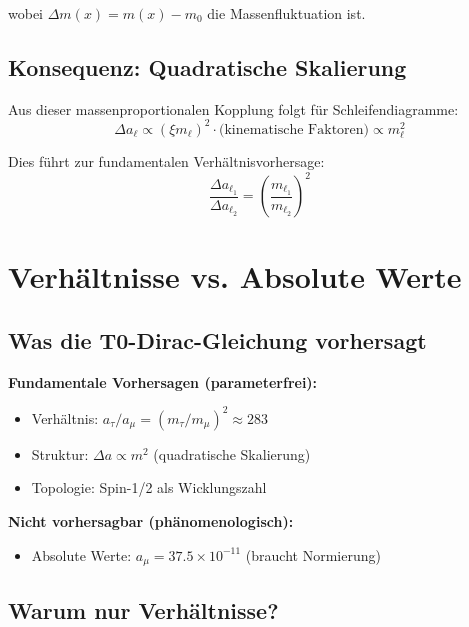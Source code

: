 	wobei $\Delta m(x) = m(x) - m_0$ die Massenfluktuation ist.
	
	\subsection{Konsequenz: Quadratische Skalierung}
	
	Aus dieser massenproportionalen Kopplung folgt für Schleifendiagramme:
	\begin{equation}
		\Delta a_\ell \propto (\xi m_\ell)^2 \cdot \text{(kinematische Faktoren)} \propto m_\ell^2
		\label{eq:quadratic_scaling}
	\end{equation}
	
	Dies führt zur fundamentalen Verhältnisvorhersage:
	\begin{equation}
		\boxed{\frac{\Delta a_{\ell_1}}{\Delta a_{\ell_2}} = \left(\frac{m_{\ell_1}}{m_{\ell_2}}\right)^2}
		\label{eq:ratio_prediction}
	\end{equation}
	
	\section{Verhältnisse vs. Absolute Werte}
	
	\subsection{Was die T0-Dirac-Gleichung vorhersagt}
	
	\textbf{Fundamentale Vorhersagen (parameterfrei):}
	\begin{itemize}
		\item Verhältnis: $a_\tau/a_\mu = (m_\tau/m_\mu)^2 \approx 283$
		\item Struktur: $\Delta a \propto m^2$ (quadratische Skalierung)
		\item Topologie: Spin-1/2 als Wicklungszahl
	\end{itemize}
	
	\textbf{Nicht vorhersagbar (phänomenologisch):}
	\begin{itemize}
		\item Absolute Werte: $a_\mu = 37.5 \times 10^{-11}$ (braucht Normierung)

	\end{itemize}
	
	\subsection{Warum nur Verhältnisse?}
	
